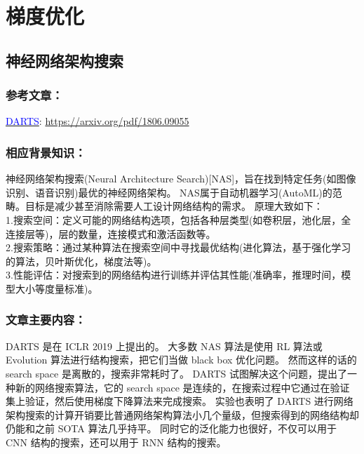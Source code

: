 \section{梯度优化}

\subsection{神经网络架构搜索}
\subsubsection{参考文章：}
\href{https://arxiv.org/pdf/1806.09055}{\textcolor{blue}{DARTS}}:
\url{https://arxiv.org/pdf/1806.09055}

\subsubsection{相应背景知识：}
神经网络架构搜索(Neural Architecture Search)[NAS]，旨在找到特定任务(如图像识别、语音识别)最优的神经网络架构。
NAS属于自动机器学习(AutoML)的范畴。目标是减少甚至消除需要人工设计网络结构的需求。
原理大致如下：\\
1.搜索空间：定义可能的网络结构选项，包括各种层类型(如卷积层，池化层，全连接层等)，层的数量，连接模式和激活函数等。\\
2.搜索策略：通过某种算法在搜索空间中寻找最优结构(进化算法，基于强化学习的算法，贝叶斯优化，梯度法等)。\\
3.性能评估：对搜索到的网络结构进行训练并评估其性能(准确率，推理时间，模型大小等度量标准)。

\subsubsection{文章主要内容：}

DARTS \cite{liu2018darts} 是在 ICLR 2019 上提出的。
大多数 NAS 算法是使用 RL 算法或 Evolution 算法进行结构搜索，把它们当做 black box 优化问题。
然而这样的话的 search space 是离散的，搜索非常耗时了。
DARTS 试图解决这个问题，提出了一种新的网络搜索算法，它的 search space 是连续的，在搜索过程中它通过在验证集上验证，然后使用梯度下降算法来完成搜索。
实验也表明了 DARTS 进行网络架构搜索的计算开销要比普通网络架构算法小几个量级，但搜索得到的网络结构却仍能和之前 SOTA 算法几乎持平。
同时它的泛化能力也很好，不仅可以用于 CNN 结构的搜索，还可以用于 RNN 结构的搜索。


